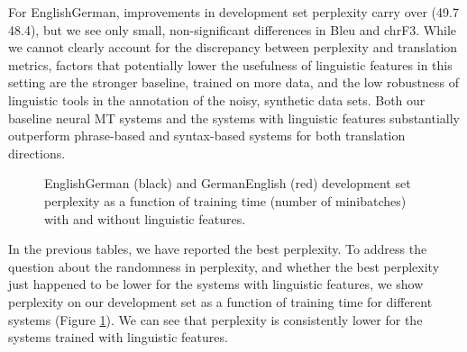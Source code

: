 \documentclass[11pt]{article}
\begin{document}
For EnglishGerman, improvements in development set perplexity carry over (49.7  48.4),
but we see only small, non-significant differences in {\sc Bleu} and {\sc chrF3}.
While we cannot clearly account for the discrepancy between perplexity and translation metrics,
factors that potentially lower the usefulness of linguistic features in this setting are the stronger baseline,
trained on more data, and the low robustness of linguistic tools in the annotation of the noisy, synthetic data sets.
Both our baseline neural MT systems and the systems with linguistic features substantially outperform phrase-based and syntax-based systems for both translation directions.

\begin{figure}

\caption{EnglishGerman (black) and GermanEnglish (red) development set perplexity as a function of training time (number of minibatches) with and without linguistic features.}
\label{perpl}
\end{figure}

In the previous tables, we have reported the best perplexity.
To address the question about the randomness in perplexity, and whether the best perplexity just happened to be lower for the systems with linguistic features,
we show perplexity on our development set as a function of training time for different systems (Figure \ref{perpl}).
We can see that perplexity is consistently lower for the systems trained with linguistic features.
\end{document}
